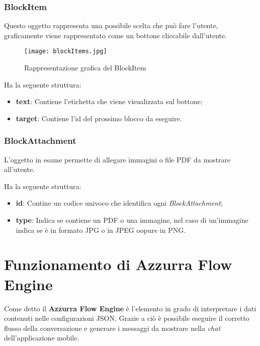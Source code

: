 \subsubsection*{BlockItem}
Questo oggetto rappresenta una possibile scelta che può fare l'utente, graficamente viene rappresentato come un bottone cliccabile dall'utente.

\begin{figure}[h]
	\centering
	\texttt{[image: blockItems.jpg]}
	\caption{Rappresentazione grafica del BlockItem}
\end{figure}
Ha la seguente struttura:

\begin{itemize}
	\item \textbf{text}: Contiene l'etichetta che viene visualizzata sul bottone;
	\item \textbf{target}: Contiene l'id del prossimo blocco da eseguire.
\end{itemize}



\subsubsection*{BlockAttachment} 
L'oggetto in esame permette di allegare immagini o file PDF da mostrare all'utente.

Ha la seguente struttura:

\begin{itemize}
	\item \textbf{id}: Contine un codice univoco che identifica ogni \textsl{BlockAttachment};
	\item \textbf{type}: Indica se contiene un PDF o una immagine, nel caso di un'immagine indica se è in formato JPG o in JPEG oopure in PNG.
\end{itemize}	

\section{Funzionamento di Azzurra Flow Engine}
Come detto il \textbf{Azzurra Flow Engine} è l'elemento in grado di interpretare i dati contenuti nelle configurazioni JSON. Grazie a ciò è possibile eseguire il corretto flusso della conversazione e generare i messaggi da mostrare nella \emph{chat} dell'applicazione mobile. 
